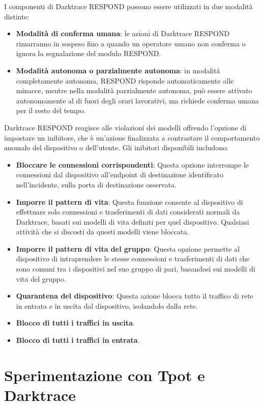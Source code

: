 \documentclass[12pt,a4paper,oneside,onecolumn,openright]{book}
\begin{document}
I componenti di Darktrace RESPOND possono essere utilizzati in due modalità distinte:
\begin{itemize}
	\item \textbf{Modalità di conferma umana}: le azioni di Darktrace RESPOND rimarranno in 
	sospeso fino a quando un operatore umano non conferma o ignora 
	la segnalazione del modulo RESPOND.
	\item \textbf{Modalità autonoma o parzialmente autonoma}: in modalità completamente 
	autonoma, RESPOND risponde automaticamente alle minacce, mentre nella modalità 
	parzialmente autonoma, può essere attivato autonomamente al di fuori degli orari 
	lavorativi, ma richiede conferma umana per il resto del tempo.
\end{itemize}


Darktrace RESPOND reagisce alle violazioni dei modelli offrendo l'opzione di impostare 
un inibitore, che è un'azione finalizzata a contrastare il comportamento anomalo del 
dispositivo o dell'utente. Gli inibitori disponibili includono:
\begin{itemize}
	\item \textbf{Bloccare le connessioni corrispondenti}: Questa opzione interrompe le 
	connessioni dal dispositivo all'endpoint di destinazione identificato nell'incidente, 
	sulla porta di destinazione osservata.
	\item \textbf{Imporre il pattern di vita}: Questa funzione consente al dispositivo 
	di effettuare solo connessioni e trasferimenti di dati considerati normali da 
	Darktrace, basati sui modelli di vita definiti per quel dispositivo. 
	Qualsiasi attività che si discosti da questi modelli viene bloccata.
	\item \textbf{Imporre il pattern di vita del gruppo}: Questa opzione permette al 
	dispositivo di intraprendere le stesse connessioni e trasferimenti di dati che 
	sono comuni tra i dispositivi nel suo gruppo di pari, basandosi sui modelli di vita 
	del gruppo.
	\item \textbf{Quarantena del dispositivo}: Questa azione blocca tutto il traffico di 
	rete in entrata e in uscita dal dispositivo, isolandolo dalla rete.
	\item \textbf{Blocco di tutti i traffici in uscita}.
	\item \textbf{Blocco di tutti i traffici in entrata}.
\end{itemize}

\chapter{Sperimentazione con Tpot e Darktrace}
\end{document}
